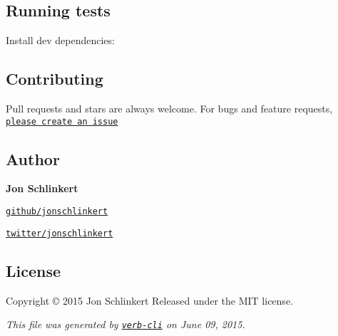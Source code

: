 \subsection*{Running tests}

Install dev dependencies\+:




\subsection*{Contributing}

Pull requests and stars are always welcome. For bugs and feature requests, \href{https://github.com/jonschlinkert/right-align/issues/new}{\tt please create an issue}

\subsection*{Author}

{\bfseries Jon Schlinkert}


\begin{DoxyItemize}
\item \href{https://github.com/jonschlinkert}{\tt github/jonschlinkert}
\item \href{http://twitter.com/jonschlinkert}{\tt twitter/jonschlinkert}
\end{DoxyItemize}

\subsection*{License}

Copyright © 2015 Jon Schlinkert Released under the M\+IT license.





{\itshape This file was generated by \href{https://github.com/assemble/verb-cli}{\tt verb-\/cli} on June 09, 2015.} 